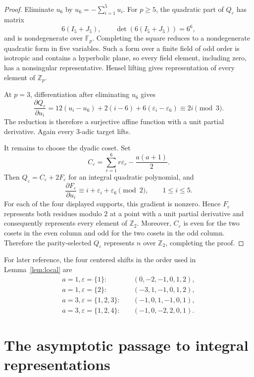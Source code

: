 \documentclass[11pt]{article}
\theoremstyle{remark}
\newcommand{\Z}{\mathbb Z}
\newcommand{\F}{\mathbb F}
\begin{document}
\begin{proof}
Eliminate $u_6$ by $u_6=-\sum_{i=1}^5u_i$.  For $p\geq5$, the quadratic
part of $Q_\varepsilon$ has matrix
\[
 6(I_5+J_5),\qquad \det(6(I_5+J_5))=6^6,
\]
and is nondegenerate over $\F_p$.  Completing the square reduces to a
nondegenerate quadratic form in five variables.  Such a form over a finite
field of odd order is isotropic and contains a hyperbolic plane, so every
field element, including zero, has a nonsingular representative.  Hensel
lifting gives representation of every element of $\Z_p$.

At $p=3$, differentiation after eliminating $u_6$ gives
\[
 \frac{\partial Q_\varepsilon}{\partial u_i}
 =12(u_i-u_6)+2(i-6)+6(\varepsilon_i-\varepsilon_6)
 \equiv 2i\pmod3.
\]
The reduction is therefore a surjective affine function with a unit partial
derivative.  Again every $3$-adic target lifts.

It remains to choose the dyadic coset.  Set
\[
 C_\varepsilon=\sum_{r=1}^6r\varepsilon_r-\frac{a(a+1)}2.
\]
Then $Q_\varepsilon=C_\varepsilon+2F_\varepsilon$ for an integral
quadratic polynomial, and
\begin{equation}\label{eq:gradient}
 \frac{\partial F_\varepsilon}{\partial u_i}
 \equiv i+\varepsilon_i+\varepsilon_6\pmod2,
 \qquad 1\leq i\leq5.
\end{equation}
For each of the four displayed supports, this gradient is nonzero.  Hence
$F_\varepsilon$ represents both residues modulo $2$ at a point with a unit
partial derivative and consequently represents every element of $\Z_2$.
Moreover, $C_\varepsilon$ is even for the two cosets in the even column and
odd for the two cosets in the odd column.  Therefore the parity-selected
$Q_\varepsilon$ represents $n$ over $\Z_2$, completing the proof.
\end{proof}

For later reference, the four centered shifts in the order used in
Lemma~\ref{lem:local} are
\begin{align*}
 a=1, \varepsilon=\{1\}:&\quad (0,-2,-1,0,1,2),\\
 a=1, \varepsilon=\{2\}:&\quad (-3,1,-1,0,1,2),\\
 a=3, \varepsilon=\{1,2,3\}:&\quad (-1,0,1,-1,0,1),\\
 a=3, \varepsilon=\{1,2,4\}:&\quad (-1,0,-2,2,0,1).
\end{align*}

\section{The asymptotic passage to integral representations}
\end{document}
